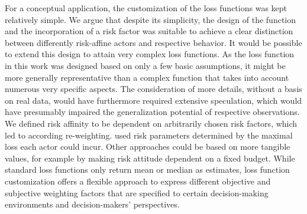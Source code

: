 	For a conceptual application, the customization of the loss functions was kept relatively simple. We argue that despite its simplicity, the design of the function and the incorporation of a risk factor was suitable to achieve a clear distinction between differently risk-affine actors and respective behavior. It would be possible to extend this design to attain very complex loss functions. As the loss function in this work was designed based on only a few basic assumptions, it might be more generally representative than a complex function that takes into account numerous very specific aspects. The consideration of more details, without a basis on real data, would have furthermore required extensive speculation, which would have presumably impaired the generalization potential of respective observations. We defined risk affinity to be dependent on arbitrarily chosen risk factors, which led to according re-weighting. \citet{davidson2015} used risk parameters determined by the maximal loss each actor could incur. Other approaches could be based on more tangible values, for example by making risk attitude dependent on a fixed budget. While standard loss functions only return mean or median as estimates, loss function customization offers a flexible approach to express different objective and subjective weighting factors that are specified to certain decision-making environments and decision-makers' perspectives.
